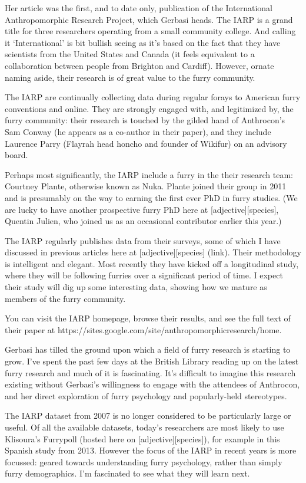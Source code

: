 Her article was the first, and to date only, publication of the International Anthropomorphic Research Project, which Gerbasi heads. The IARP is a grand title for three researchers operating from a small community college. And calling it `International' is bit bullish seeing as it's based on the fact that they have scientists from the United States and Canada (it feels equivalent to a collaboration between people from Brighton and Cardiff). However, ornate naming aside, their research is of great value to the furry community.

The IARP are continually collecting data during regular forays to American furry conventions and online. They are strongly engaged with, and legitimized by, the furry community: their research is touched by the gilded hand of Anthrocon's Sam Conway (he appears as a co-author in their paper), and they include Laurence Parry (Flayrah head honcho and founder of Wikifur) on an advisory board.

Perhaps most significantly, the IARP include a furry in the their research team: Courtney Plante, otherwise known as Nuka. Plante joined their group in 2011 and is presumably on the way to earning the first ever PhD in furry studies. (We are lucky to have another prospective furry PhD here at [adjective][species], Quentin Julien, who joined us as an occasional contributor earlier this year.)

The IARP regularly publishes data from their surveys, some of which I have discussed in previous articles here at [adjective][species] (link). Their methodology is intelligent and elegant. Most recently they have kicked off a longitudinal study, where they will be following furries over a significant period of time. I expect their study will dig up some interesting data, showing how we mature as members of the furry community.

You can visit the IARP homepage, browse their results, and see the full text of their paper at https://sites.google.com/site/anthropomorphicresearch/home.

Gerbasi has tilled the ground upon which a field of furry research is starting to grow. I've spent the past few days at the British Library reading up on the latest furry research and much of it is fascinating. It's difficult to imagine this research existing without Gerbasi's willingness to engage with the attendees of Anthrocon, and her direct exploration of furry psychology and popularly-held stereotypes.

The IARP dataset from 2007 is no longer considered to be particularly large or useful. Of all the available datasets, today's researchers are most likely to use Klisoura's Furrypoll (hosted here on [adjective][species]), for example in this Spanish study from 2013. However the focus of the IARP in recent years is more focussed: geared towards understanding furry psychology, rather than simply furry demographics. I'm fascinated to see what they will learn next.
